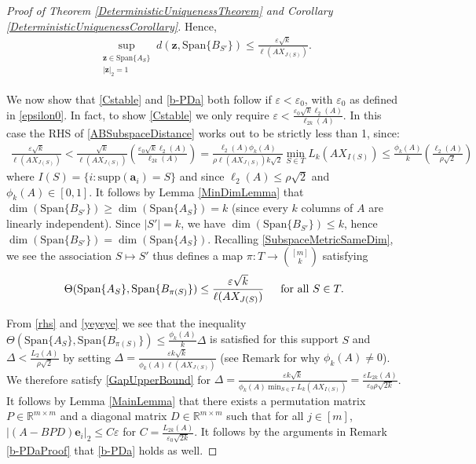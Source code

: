 \documentclass[journal, onecolumn]{IEEEtran}
\begin{document}
\begin{proof}[Proof of Theorem \ref{DeterministicUniquenessTheorem} and Corollary \ref{DeterministicUniquenessCorollary}]
Hence,
\begin{align}\label{ABSubspaceDistance}
\sup_{ \substack{ \mathbf{z} \in \text{Span}\{A_{S}\} \\ |\mathbf{z}|_2 = 1} } d(\mathbf{z}, \text{Span}\{B_{S'}\}) \leq \frac{\varepsilon\sqrt{k}}{\ell(AX_{J(S)})}.
\end{align}

We now show that \eqref{Cstable} and \eqref{b-PDa} both follow if $\varepsilon < \varepsilon_0$, with $\varepsilon_0$ as defined in \eqref{epsilon0}. In fact, to show \eqref{Cstable} we only require $\varepsilon <  \frac{\varepsilon_0 \sqrt{k} \ell_2(A)}{\ell_{2k}(A)}$. In this case the RHS of \eqref {ABSubspaceDistance} works out to be strictly less than 1, since:
\begin{align}\label{rhs}
\frac{\varepsilon\sqrt{k}}{\ell(AX_{J(S)})} 
< \frac{\sqrt{k}}{\ell(AX_{J(S)})} \left( \frac{\varepsilon_0 \sqrt{k} \ell_2(A)}{\ell_{2k}(A)} \right)
= \frac{\ell_2(A) \phi_k(A)}{\rho \ell(AX_{J(S)}) k \sqrt{2}} \min_{S \in T}L_k(AX_{I(S)})
\leq \frac{\phi_k(A)}{k} \left( \frac{\ell_2(A)}{ \rho \sqrt{2}} \right)
\end{align}
%
where $I(S) = \{i: \text{supp}(\mathbf{a}_i)=S\}$ and since $\ell_2(A) \leq \rho \sqrt{2}$ and $\phi_k(A) \in [0,1]$. It follows by Lemma \ref{MinDimLemma} that $\dim(\text{Span}\{B_{S'}\}) \geq \dim(\text{Span}\{A_{S}\}) = k$ (since every $k$ columns of $A$ are linearly independent). Since $|S'| = k$, we have $\dim(\text{Span}\{B_{S'}\}) \leq k$, hence $\dim(\text{Span}\{B_{S'}\}) = \dim(\text{Span}\{A_{S}\})$. Recalling \eqref{SubspaceMetricSameDim},  we see the association $S \mapsto S'$ thus defines a map $\pi: T \to {[m] \choose k}$ satisfying
\begin{align}\label{yeyeye}
\Theta(\text{Span}\{A_{S}\}, \text{Span}\{B_{\pi(S)}\}) \leq \frac{\varepsilon\sqrt{k}}{\ell(AX_{J(S)})} \indent \text{for all } S \in T.
\end{align}

From \eqref{rhs} and \eqref{yeyeye} we see that the inequality $\Theta(\text{Span}\{A_{S}\}, \text{Span}\{B_{\pi(S)}\}) \leq \frac{ \phi_k(A) }{k} \Delta$ is satisfied for this support $S$ and $\Delta < \frac{L_2(A)}{\rho \sqrt{2}}$ by setting $\Delta = \frac{\varepsilon k\sqrt{k}}{\phi_k(A)\ell(AX_{J(S)})}$ (see Remark \label{nonzero} for why $\phi_k(A) \neq 0$). We therefore satisfy \eqref{GapUpperBound} for $\Delta = \frac{\varepsilon k\sqrt{k}}{\phi_k(A)\min_{S \in T} L_k(AX_{I(S)})} = \frac{\varepsilon L_{2k}(A)}{\varepsilon_0 \rho \sqrt{2k}}$. It follows by Lemma \ref{MainLemma} that there exists a permutation matrix $P \in \mathbb{R}^{m \times m}$ and a diagonal matrix $D \in \mathbb{R}^{m \times m}$ such that for all $j \in [m]$,
$|(A - BPD)\mathbf{e}_i|_2 \leq C\varepsilon$ for $C = \frac{ L_{2k}(A)}{\varepsilon_0 \sqrt{2k}}$. It follows by the arguments in Remark \ref{b-PDaProof} that \eqref{b-PDa} holds as well.
\end{proof}
\end{document}
